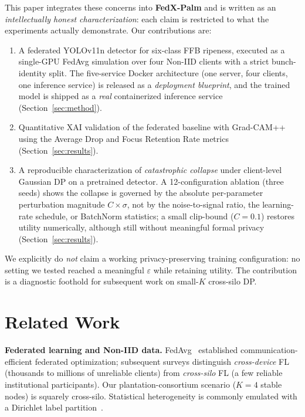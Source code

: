 \documentclass[conference]{IEEEtran}
\begin{document}
This paper integrates these concerns into \textbf{FedX-Palm} and is written
as an \emph{intellectually honest characterization}: each claim is restricted
to what the experiments actually demonstrate. Our contributions are:
\begin{enumerate}
\item A federated YOLOv11n detector for six-class FFB ripeness, executed as
a single-GPU FedAvg simulation over four Non-IID clients with a strict
bunch-identity split. The five-service Docker architecture (one server, four
clients, one inference service) is released as a \emph{deployment blueprint},
and the trained model is shipped as a \emph{real} containerized inference
service (Section~\ref{sec:method}).
\item Quantitative XAI validation of the federated baseline with Grad-CAM++
using the Average Drop and Focus Retention Rate metrics
(Section~\ref{sec:results}).
\item A reproducible characterization of \emph{catastrophic collapse} under
client-level Gaussian DP on a pretrained detector. A 12-configuration
ablation (three seeds) shows the collapse is governed by the absolute
per-parameter perturbation magnitude $C\!\times\!\sigma$, not by the
noise-to-signal ratio, the learning-rate schedule, or BatchNorm statistics;
a small clip-bound ($C{=}0.1$) restores utility numerically, although still
without meaningful formal privacy (Section~\ref{sec:results}).
\end{enumerate}

We explicitly do \emph{not} claim a working privacy-preserving training
configuration: no setting we tested reached a meaningful $\varepsilon$ while
retaining utility. The contribution is a diagnostic foothold for subsequent
work on small-$K$ cross-silo DP.

\section{Related Work}
\textbf{Federated learning and Non-IID data.} FedAvg~\cite{mcmahan2017communication}
established communication-efficient federated optimization; subsequent surveys
\cite{kairouz2021advances,li2020federated} distinguish \emph{cross-device} FL
(thousands to millions of unreliable clients) from \emph{cross-silo} FL (a few
reliable institutional participants). Our plantation-consortium scenario
($K{=}4$ stable nodes) is squarely cross-silo. Statistical heterogeneity is
commonly emulated with a Dirichlet label
partition~\cite{hsu2019measuring}.
\end{document}
